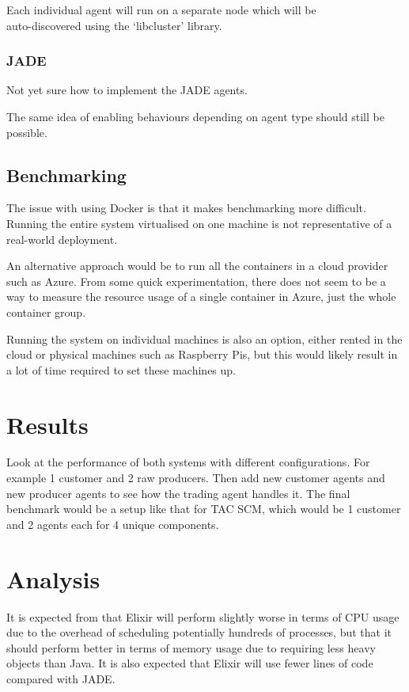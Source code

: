 \documentclass[12pt,a4paper]{article}
\begin{document}
Each individual agent will run on a separate node which will be\\auto-discovered using the `libcluster' library.

\subsubsection{JADE}

Not yet sure how to implement the JADE agents.

The same idea of enabling behaviours depending on agent type should still be possible.

\subsection{Benchmarking}

The issue with using Docker is that it makes benchmarking more difficult.
Running the entire system virtualised on one machine is not representative of a real-world deployment.

An alternative approach would be to run all the containers in a cloud provider such as Azure.
From some quick experimentation, there does not seem to be a way to measure the resource usage of a single container in Azure, just the whole container group.

Running the system on individual machines is also an option, either rented in the cloud or physical machines such as Raspberry Pis, but this would likely result in a lot of time required to set these machines up.

\section{Results}

Look at the performance of both systems with different configurations.
For example 1 customer and 2 raw producers.
Then add new customer agents and new producer agents to see how the trading agent handles it.
The final benchmark would be a setup like that for TAC SCM, which would be 1 customer and 2 agents each for 4 unique components.

\section{Analysis}

It is expected from  that Elixir will perform slightly worse in terms of CPU usage due to the overhead of scheduling potentially hundreds of processes, but that it should perform better in terms of memory usage due to requiring less heavy objects than Java.
It is also expected that Elixir will use fewer lines of code compared with JADE\@.
\end{document}
